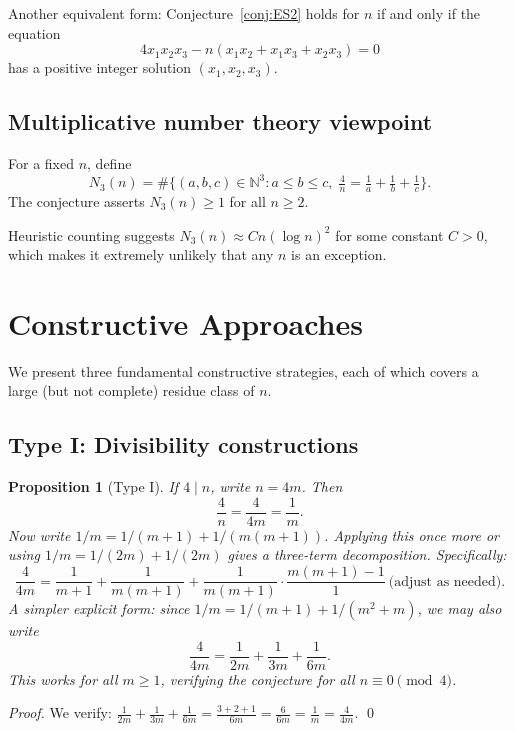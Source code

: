 \documentclass[12pt,a4paper]{amsart}
\newtheorem{proposition}[theorem]{Proposition}
\theoremstyle{definition}
\newcommand{\N}{\mathbb{N}}
\begin{document}
Another equivalent form: Conjecture~\ref{conj:ES2} holds for $n$ if and
only if the equation
\[
  4x_1 x_2 x_3 - n(x_1 x_2 + x_1 x_3 + x_2 x_3) = 0
\]
has a positive integer solution $(x_1, x_2, x_3)$.

\subsection{Multiplicative number theory viewpoint}

For a fixed $n$, define
\[
  N_3(n) = \#\{(a,b,c) \in \N^3 : a \leq b \leq c,\;
            \tfrac{4}{n} = \tfrac{1}{a} + \tfrac{1}{b} + \tfrac{1}{c}\}.
\]
The conjecture asserts $N_3(n) \geq 1$ for all $n \geq 2$.

Heuristic counting suggests $N_3(n) \approx C n (\log n)^2$ for some
constant $C > 0$, which makes it extremely unlikely that any $n$ is
an exception.

\section{Constructive Approaches}

We present three fundamental constructive strategies, each of which
covers a large (but not complete) residue class of $n$.

\subsection{Type I: Divisibility constructions}

\begin{proposition}[Type I]\label{prop:typeI}
If $4 \mid n$, write $n = 4m$. Then
\[
  \frac{4}{n} = \frac{4}{4m} = \frac{1}{m}.
\]
Now write $1/m = 1/(m+1) + 1/(m(m+1))$. Applying this once more or
using $1/m = 1/(2m) + 1/(2m)$ gives a three-term decomposition.
Specifically:
\[
  \frac{4}{4m} = \frac{1}{m+1} + \frac{1}{m(m+1)} + \frac{1}{m(m+1)} \cdot
  \frac{m(m+1)-1}{1}~\text{(adjust as needed)}.
\]
A simpler explicit form: since $1/m = 1/(m+1) + 1/(m^2+m)$, we may also write
\[
  \frac{4}{4m} = \frac{1}{2m} + \frac{1}{3m} + \frac{1}{6m}.
\]
This works for all $m \geq 1$, verifying the conjecture for all $n \equiv 0 \pmod 4$.
\end{proposition}

\begin{proof}
We verify: $\frac{1}{2m} + \frac{1}{3m} + \frac{1}{6m} = \frac{3+2+1}{6m} = \frac{6}{6m} = \frac{1}{m} = \frac{4}{4m}$. \qed
\end{proof}
\end{document}
